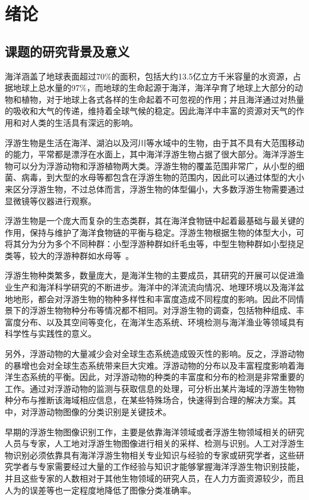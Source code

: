 \chapter{绪论}
\label{cha:intro}

\section{课题的研究背景及意义}
海洋涵盖了地球表面超过70\%的面积，包括大约13.5亿立方千米容量的水资源，占据地球上总水量的97\%，而地球的生命起源于海洋，海洋孕育了地球上大部分的动物和植物，对于地球上各式各样的生命起着不可忽视的作用；并且海洋通过对热量的吸收和大气的传递，维持着全球气候的稳定。因此海洋中丰富的资源对天气的作用和对人类的生活具有深远的影响。

浮游生物是生活在海洋、湖泊以及河川等水域中的生物，由于其不具有大范围移动的能力，平常都是漂浮在水面上，其中海洋浮游生物占据了很大部分。海洋浮游生物可以分为浮游动物和浮游植物两大类。浮游生物的覆盖范围非常广，从小型的细菌、病毒，到大型的水母等都包含在浮游生物的范围内，因此可以通过体型的大小来区分浮游生物，不过总体而言，浮游生物的体型偏小，大多数浮游生物需要通过显微镜等仪器进行观察。

浮游生物是一个庞大而复杂的生态类群，其在海洋食物链中起着最基础与最关键的作用，保持与维护了海洋食物链的平衡与稳定。浮游生物根据生物的体型大小，可将其分为分为多个不同种群：小型浮游种群如纤毛虫等，中型生物种群如小型挠足类等，较大的浮游种群如水母等~\cite{2003}。

浮游生物种类繁多，数量庞大，是海洋生物的主要成员，其研究的开展可以促进渔业生产和海洋科学研究的不断进步。海洋中的洋流流向情况、地理环境以及海洋盆地地形，都会对浮游生物的物种多样性和丰富度造成不同程度的影响。因此不同情景下的浮游生物物种分布等情况都不相同。对浮游生物的调查，包括物种组成、丰富度分布、以及其空间等变化，在海洋生态系统、环境检测与海洋渔业等领域具有科学性与实践性的意义。

另外，浮游动物的大量减少会对全球生态系统造成毁灭性的影响。反之，浮游动物的暴增也会对全球生态系统带来巨大灾难。浮游动物的分布以及丰富程度影响着海洋生态系统的平衡。因此，对浮游动物的种类的丰富度和分布的检测是非常重要的工作。通过对浮游动物的监测与获取信息的处理，可分析出某片海域的浮游生物物种分布与推断该海域相应信息，在某些特殊场合，快速得到合理的解决方案。其中，对浮游动物图像的分类识别是关键技术。 

早期的浮游生物图像识别工作，主要是依靠海洋领域或者浮游生物领域相关的研究人员与专家，人工地对浮游生物图像进行相关的采样、检测与识别。人工对浮游生物识别必须依靠具有海洋浮游生物相关专业知识与经验的专家或研究学者，这些研究学者与专家需要经过大量的工作经验与知识才能够掌握海洋浮游生物识别技能，并且这些专家的人数相对于其他生物领域的研究人员，在人力方面资源较少，而且人为的误差等也一定程度地降低了图像分类准确率。

